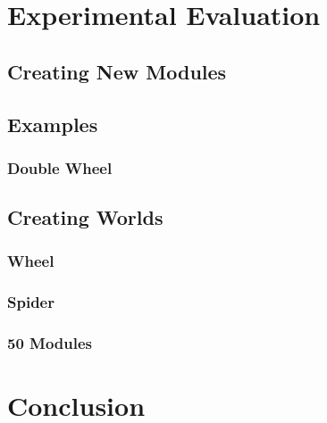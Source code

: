\documentclass[
  digital, %
  table,   %
  oneside, %
  nolof,     %
  nolot,     %
]{fithesis3}
\begin{document}
\chapter{Experimental Evaluation}

\section{Creating New Modules}
\label{ex-modules}


\section{Examples}

\subsection{Double Wheel}


\section{Creating Worlds}

\subsection{Wheel}

\subsection{Spider}

\subsection{50 Modules}


\chapter{Conclusion}
\end{document}
